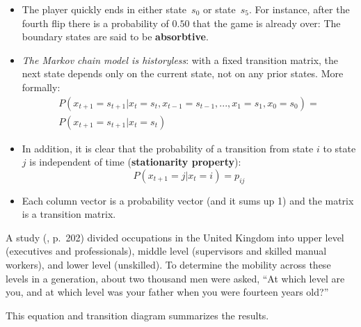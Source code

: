 \begin{itemize}
    \item The player quickly ends in either state~$s_0$
    or state~$s_5$. For instance, after the fourth flip there is a probability of $0.50$ that
    the game is already over: The boundary states
    are said to be {\bf absorbtive}.
    \item {\em The Markov chain model is
    historyless}: with a fixed transition matrix, the next state depends only on the current state,
    not on any prior states. More formally:
    \begin{eqnarray*}
    P(x_{t+1}=s_{t+1}|x_t=s_t, x_{t-1}=s_{t-1},...,x_1=s_1,x_0=s_0)=\\
    P(x_{t+1}=s_{t+1}|x_t=s_t)
  \end{eqnarray*}
    \item In addition, it is clear that the probability of a transition from state $i$ to state $j$ is independent of time ({\bf stationarity property}):
    \[
    P(x_{t+1}=j|x_t=i)=p_{ij}
    \]
    \item Each column vector is a probability vector (and it sums up 1) and the matrix is a transition matrix.
\end{itemize}


\begin{Exercise}
    A study (\cite{macdonald_social_1988}, p.~202)
divided occupations in the United Kingdom into
upper level (executives and professionals),
middle level (supervisors and skilled manual workers),
and lower level (unskilled).
To determine
the mobility across these levels in a generation, about
two thousand men were asked, ``At which level are you,
and at which level was your father when you were fourteen years old?''
\end{Exercise}

This equation and transition diagram summarizes the results.

